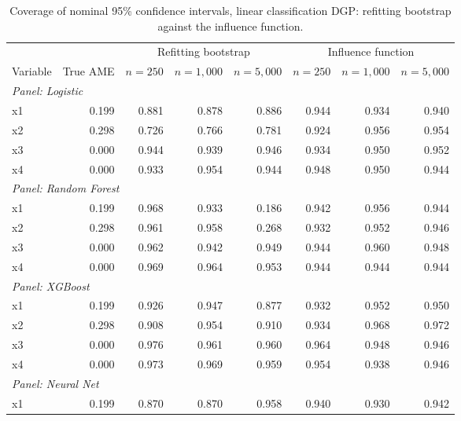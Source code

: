 \documentclass[12pt,a4paper]{article}
\numberwithin{equation}{section}
\theoremstyle{plain}
\theoremstyle{definition}
\begin{document}
	\begin{table}[htbp]
		\centering
		\small
		\begin{threeparttable}
			\caption{Coverage of nominal 95\% confidence intervals, linear classification DGP: refitting bootstrap against the influence function.}
			\label{tab:sim3_coverage_classification_linear}
			\begin{tabular}{lrrrrrrr}
				\toprule
				& & \multicolumn{3}{c}{Refitting bootstrap} & \multicolumn{3}{c}{Influence function} \\
				\cmidrule(lr){3-5} \cmidrule(lr){6-8}
				Variable & True AME & $n=250$ & $n=1,000$ & $n=5,000$ & $n=250$ & $n=1,000$ & $n=5,000$ \\
				\midrule
				\multicolumn{8}{l}{\textit{Panel: Logistic}} \\
				\quad x1 & 0.199 & 0.881 & 0.878 & 0.886 & 0.944 & 0.934 & 0.940 \\
				\quad x2 & 0.298 & 0.726 & 0.766 & 0.781 & 0.924 & 0.956 & 0.954 \\
				\quad x3 & 0.000 & 0.944 & 0.939 & 0.946 & 0.934 & 0.950 & 0.952 \\
				\quad x4 & 0.000 & 0.933 & 0.954 & 0.944 & 0.948 & 0.950 & 0.944 \\
				\midrule
				\multicolumn{8}{l}{\textit{Panel: Random Forest}} \\
				\quad x1 & 0.199 & 0.968 & 0.933 & 0.186 & 0.942 & 0.956 & 0.944 \\
				\quad x2 & 0.298 & 0.961 & 0.958 & 0.268 & 0.932 & 0.952 & 0.946 \\
				\quad x3 & 0.000 & 0.962 & 0.942 & 0.949 & 0.944 & 0.960 & 0.948 \\
				\quad x4 & 0.000 & 0.969 & 0.964 & 0.953 & 0.944 & 0.944 & 0.944 \\
				\midrule
				\multicolumn{8}{l}{\textit{Panel: XGBoost}} \\
				\quad x1 & 0.199 & 0.926 & 0.947 & 0.877 & 0.932 & 0.952 & 0.950 \\
				\quad x2 & 0.298 & 0.908 & 0.954 & 0.910 & 0.934 & 0.968 & 0.972 \\
				\quad x3 & 0.000 & 0.976 & 0.961 & 0.960 & 0.964 & 0.948 & 0.946 \\
				\quad x4 & 0.000 & 0.973 & 0.969 & 0.959 & 0.954 & 0.938 & 0.946 \\
				\midrule
				\multicolumn{8}{l}{\textit{Panel: Neural Net}} \\
				\quad x1 & 0.199 & 0.870 & 0.870 & 0.958 & 0.940 & 0.930 & 0.942 \\

\end{tabular}
\end{threeparttable}
\end{table}
\end{document}
